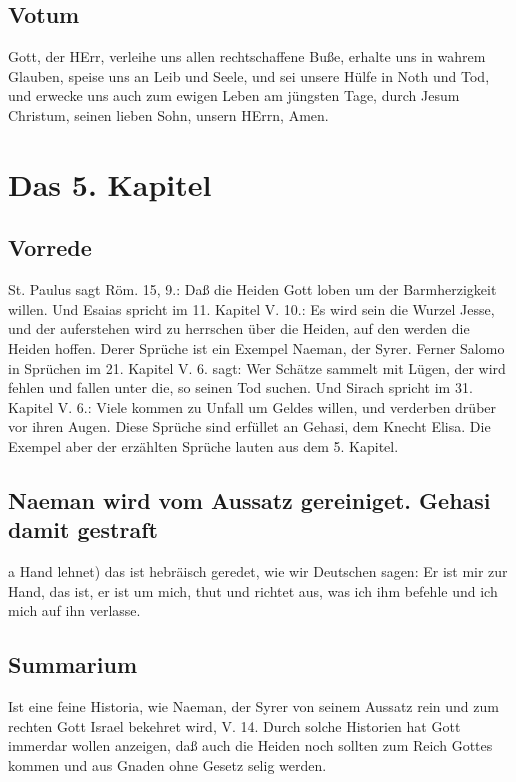 \section{Votum}

Gott, der HErr, verleihe uns allen rechtschaffene Buße, erhalte uns in wahrem Glauben, speise uns an Leib und Seele, und sei unsere Hülfe in Noth und Tod, und erwecke uns auch zum ewigen Leben am jüngsten Tage, durch Jesum Christum, seinen lieben Sohn, unsern HErrn, Amen.

\chapter{Das 5. Kapitel}

\section{Vorrede}

St. Paulus sagt Röm. 15, 9.: Daß die Heiden Gott loben um der Barmherzigkeit willen. Und Esaias spricht im 11. Kapitel V. 10.: Es wird sein die Wurzel Jesse, und der auferstehen wird zu herrschen über die Heiden, auf den werden die Heiden hoffen. Derer Sprüche ist ein Exempel Naeman, der Syrer. Ferner Salomo in Sprüchen im 21. Kapitel V. 6. sagt: Wer Schätze sammelt mit Lügen, der wird fehlen und fallen unter die, so seinen Tod suchen. Und Sirach spricht im 31. Kapitel V. 6.: Viele kommen zu Unfall um Geldes willen, und verderben drüber vor ihren Augen. Diese Sprüche sind erfüllet an Gehasi, dem Knecht Elisa. Die Exempel aber der erzählten Sprüche lauten aus dem 5. Kapitel.

\section{Naeman wird vom Aussatz gereiniget. Gehasi damit gestraft}

a Hand lehnet) das ist hebräisch geredet, wie wir Deutschen sagen: Er ist mir zur Hand, das ist, er ist um mich, thut und richtet aus, was ich ihm befehle und ich mich auf ihn verlasse.

\section{Summarium}

Ist eine feine Historia, wie Naeman, der Syrer von seinem Aussatz rein und zum rechten Gott Israel bekehret wird, V. 14. Durch solche Historien hat Gott immerdar wollen anzeigen, daß auch die Heiden noch sollten zum Reich Gottes kommen und aus Gnaden ohne Gesetz selig werden.

